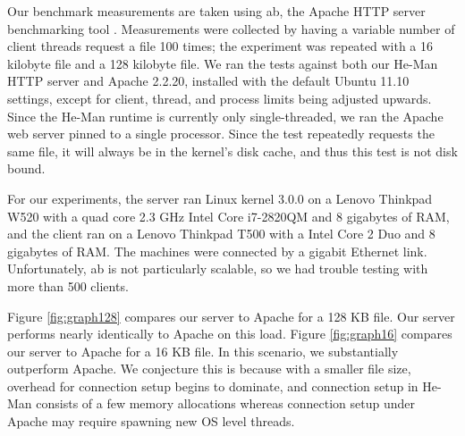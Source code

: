 \documentclass[preprint]{sigplanconf}
\begin{document}
Our benchmark measurements are taken using ab, the Apache HTTP server
benchmarking tool \cite{ApacheAB}. Measurements were collected by
having a variable number of client threads request a file 100 times;
the experiment was repeated with a 16 kilobyte file and a 128 kilobyte
file. We ran the tests against both our He-Man HTTP server and Apache
2.2.20, installed with the default Ubuntu 11.10 settings, except for
client, thread, and process limits being adjusted upwards. Since the
He-Man runtime is currently only single-threaded, we ran the Apache
web server pinned to a single processor. Since the test repeatedly
requests the same file, it will always be in the kernel's disk cache,
and thus this test is not disk bound.

For our experiments, the server ran Linux kernel 3.0.0 on a Lenovo
Thinkpad W520 with a quad core 2.3 GHz Intel Core i7-2820QM and 8
gigabytes of RAM, and the client ran on a Lenovo Thinkpad T500 with a
Intel Core 2 Duo and 8 gigabytes of RAM.  %
The machines were connected by a gigabit Ethernet link.
Unfortunately, ab is not particularly scalable, so we had trouble
testing with more than 500 clients.

Figure \ref{fig:graph128} compares our server to Apache for a 128 KB
file. Our server performs nearly identically to Apache on this load.
Figure \ref{fig:graph16} compares our server to Apache for a 16 KB
file. In this scenario, we substantially outperform Apache. We
conjecture this is because with a smaller file size, overhead for
connection setup begins to dominate, and connection setup in He-Man
consists of a few memory allocations whereas connection setup under
Apache may require spawning new OS level threads.
\end{document}
